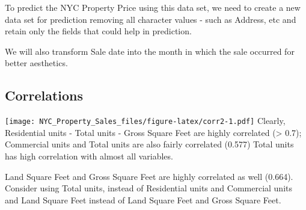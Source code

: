\documentclass[
  a3paper,
]{article}
\newenvironment{Shaded}{\begin{snugshade}}{\end{snugshade}}
\newcommand{\DataTypeTok}[1]{\textcolor[rgb]{0.13,0.29,0.53}{#1}}
\newcommand{\DecValTok}[1]{\textcolor[rgb]{0.00,0.00,0.81}{#1}}
\newcommand{\KeywordTok}[1]{\textcolor[rgb]{0.13,0.29,0.53}{\textbf{#1}}}
\newcommand{\NormalTok}[1]{#1}
\newcommand{\OperatorTok}[1]{\textcolor[rgb]{0.81,0.36,0.00}{\textbf{#1}}}
\newcommand{\StringTok}[1]{\textcolor[rgb]{0.31,0.60,0.02}{#1}}
\begin{document}
To predict the NYC Property Price using this data set, we need to create
a new data set for prediction removing all character values - such as
Address, etc and retain only the fields that could help in prediction.

We will also transform Sale date into the month in which the sale
occurred for better aesthetics.

\begin{Shaded}
\end{Shaded}

\hypertarget{correlations}{%
\subsection{\texorpdfstring{\textbf{Correlations}}{Correlations}}\label{correlations}}

\texttt{[image: NYC\_Property\_Sales\_files/figure-latex/corr2-1.pdf]}
Clearly, Residential units - Total units - Gross Square Feet are highly
correlated (\textgreater{} 0.7); Commercial units and Total units are
also fairly correlated (0.577) Total units has high correlation with
almost all variables.

Land Square Feet and Gross Square Feet are highly correlated as well
(0.664). Consider using Total units, instead of Residential units and
Commercial units and Land Square Feet instead of Land Square Feet and
Gross Square Feet.
\end{document}
